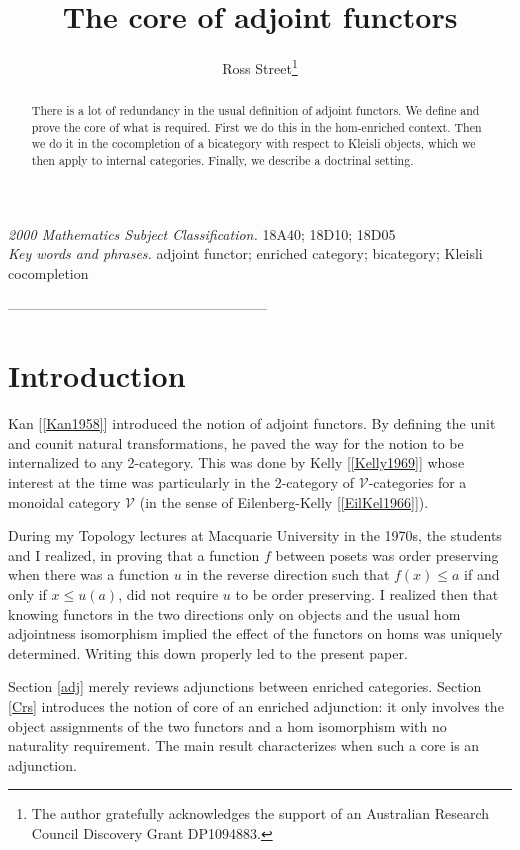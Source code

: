 \documentclass[a4paper,10pt]{article}
\newcommand{\ev}{\mathcal{V} }
\numberwithin{equation}{section}
\begin{document}
\author{Ross Street\footnote{The author gratefully acknowledges the support of an Australian Research Council Discovery Grant DP1094883.}}
\title{The core of adjoint functors}
\date{}
\maketitle
\begin{center}
{\small{\emph{2000 Mathematics Subject Classification.} \quad 18A40; 18D10; 18D05}}
\\
{\small{\emph{Key words and phrases.} \quad adjoint functor; enriched category; bicategory; Kleisli cocompletion}}

--------------------------------------------------------
\end{center}
\begin{abstract}
\noindent There is a lot of redundancy in the usual definition of adjoint functors. We define and prove the core of what is required. First we do this in the hom-enriched context. Then we do it in the cocompletion of a bicategory with respect to Kleisli objects, which we then apply to internal categories. Finally, we describe a doctrinal setting. 
\end{abstract}
\tableofcontents


\section{Introduction}

Kan [\ref{Kan1958}] introduced the notion of adjoint functors. By defining the unit and counit natural transformations, he paved the way for the notion to be internalized to any 2-category. This was done by Kelly [\ref{Kelly1969}] whose interest at the time was particularly in the 2-category of $\ev$-categories for a monoidal category $\ev$ (in the sense of Eilenberg-Kelly [\ref{EilKel1966}]). 

During my Topology lectures at Macquarie University in the 1970s, the students and I realized, in proving that a function $f$ between posets was order preserving when there was a function $u$ in the reverse direction such that $f(x) \le a$ if and only if $x \le u(a)$, did not require $u$ to be order preserving. I realized then that knowing functors in the two directions only on objects and the usual hom adjointness isomorphism implied the effect of the functors on homs was uniquely determined. Writing this down properly led to the present paper. 

Section \ref{adj} merely reviews adjunctions between enriched categories. Section \ref{Crs}  introduces the notion of core of an enriched adjunction: it only involves the object assignments of the two functors and a hom isomorphism with no naturality requirement. The main result characterizes when such a core is an adjunction. 
\end{document}
